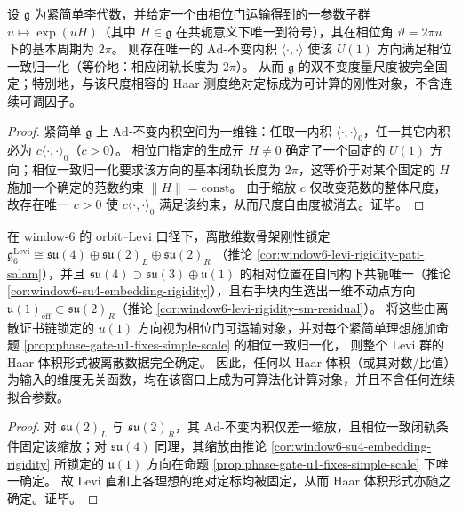 \begin{proposition}\label{prop:phase-gate-u1-fixes-simple-scale}
设 \(\mathfrak g\) 为紧简单李代数，并给定一个由相位门运输得到的一参数子群 \(u\mapsto \exp(uH)\)（其中 \(H\in\mathfrak g\) 在共轭意义下唯一到符号），其在相位角 \(\vartheta=2\pi u\) 下的基本周期为 \(2\pi\)。
则存在唯一的 \(\mathrm{Ad}\)-不变内积 \(\langle\cdot,\cdot\rangle\) 使该 \(U(1)\) 方向满足相位一致归一化（等价地：相应闭轨长度为 \(2\pi\)）。
从而 \(\mathfrak g\) 的双不变度量尺度被完全固定；特别地，与该尺度相容的 Haar 测度绝对定标成为可计算的刚性对象，不含连续可调因子。
\end{proposition}
\begin{proof}
紧简单 \(\mathfrak g\) 上 \(\mathrm{Ad}\)-不变内积空间为一维锥：任取一内积 \(\langle\cdot,\cdot\rangle_{0}\)，任一其它内积必为 \(c\langle\cdot,\cdot\rangle_{0}\)（\(c>0\)）。
相位门指定的生成元 \(H\neq 0\) 确定了一个固定的 \(U(1)\) 方向；相位一致归一化要求该方向的基本闭轨长度为 \(2\pi\)，这等价于对某个固定的 \(H\) 施加一个确定的范数约束 \(\|H\|=\mathrm{const}\)。
由于缩放 \(c\) 仅改变范数的整体尺度，故存在唯一 \(c>0\) 使 \(c\langle\cdot,\cdot\rangle_{0}\) 满足该约束，从而尺度自由度被消去。证毕。
\end{proof}

\begin{corollary}\label{cor:window6-levi-haar-volume-rigidity}
在 window-\(6\) 的 orbit--Levi 口径下，离散维数骨架刚性锁定
\(
\mathfrak g^{\mathrm{Levi}}_6\cong \mathfrak{su}(4)\oplus \mathfrak{su}(2)_L\oplus \mathfrak{su}(2)_R
\)
（推论 \ref{cor:window6-levi-rigidity-pati-salam}），并且 \(\mathfrak{su}(4)\supset \mathfrak{su}(3)\oplus\mathfrak u(1)\) 的相对位置在自同构下共轭唯一（推论 \ref{cor:window6-su4-embedding-rigidity}），且右手块内生选出一维不动点方向 \(\mathfrak u(1)_{\mathrm{eff}}\subset \mathfrak{su}(2)_R\)（推论 \ref{cor:window6-levi-rigidity-sm-residual}）。
将这些由离散证书链锁定的 \(u(1)\) 方向视为相位门可运输对象，并对每个紧简单理想施加命题 \ref{prop:phase-gate-u1-fixes-simple-scale} 的相位一致归一化，
则整个 Levi 群的 Haar 体积形式被离散数据完全确定。
因此，任何以 Haar 体积（或其对数/比值）为输入的维度无关函数，均在该窗口上成为可算法化计算对象，并且不含任何连续拟合参数。
\end{corollary}
\begin{proof}
对 \(\mathfrak{su}(2)_L\) 与 \(\mathfrak{su}(2)_R\)，其 \(\mathrm{Ad}\)-不变内积仅差一缩放，且相位一致闭轨条件固定该缩放；对 \(\mathfrak{su}(4)\) 同理，其缩放由推论 \ref{cor:window6-su4-embedding-rigidity} 所锁定的 \(\mathfrak u(1)\) 方向在命题 \ref{prop:phase-gate-u1-fixes-simple-scale} 下唯一确定。
故 Levi 直和上各理想的绝对定标均被固定，从而 Haar 体积形式亦随之确定。证毕。
\end{proof}

